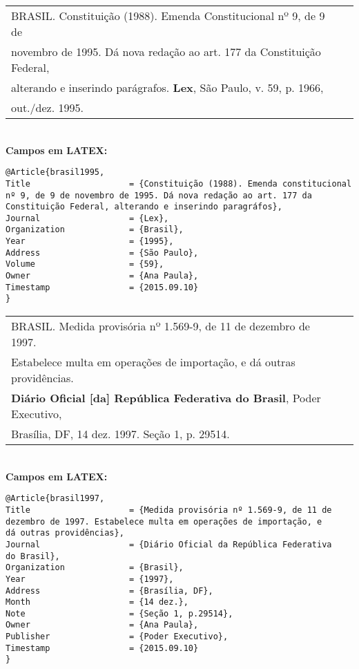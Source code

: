 \begin{tabular}{|l|c|} \hline
BRASIL. Constituição (1988). Emenda Constitucional 
nº 9, de 9 de \\novembro de 1995. Dá nova redação ao art. 177 da Constituição
Federal,\\ alterando e inserindo parágrafos. \textbf{Lex}, São Paulo, v. 59, p. 1966, \\out./dez. 1995.  
	\\\hline
\end{tabular} \\

\textbf{Campos em LATEX:} 

\begin{verbatim}
@Article{brasil1995,
Title                    = {Constituição (1988). Emenda constitucional 
nº 9, de 9 de novembro de 1995. Dá nova redação ao art. 177 da 
Constituição Federal, alterando e inserindo paragráfos},
Journal                  = {Lex},
Organization             = {Brasil},
Year                     = {1995},
Address                  = {São Paulo},
Volume                   = {59},
Owner                    = {Ana Paula},
Timestamp                = {2015.09.10}
}
\end{verbatim}

\begin{tabular}{|l|c|} \hline
BRASIL. Medida provisória nº 1.569-9, de 11 de dezembro de 1997.\\
Estabelece multa em operações de importação, e dá outras
providências.\\ \textbf{Diário Oficial [da] República Federativa do Brasil},
Poder Executivo, \\Brasília, DF, 14 dez. 1997. Seção 1, p. 29514.  
	\\\hline
\end{tabular} \\

\textbf{Campos em LATEX:} 

\begin{verbatim}
@Article{brasil1997,
Title                    = {Medida provisória nº 1.569-9, de 11 de 
dezembro de 1997. Estabelece multa em operações de importação, e 
dá outras providências},
Journal                  = {Diário Oficial da República Federativa 
do Brasil},
Organization             = {Brasil},
Year                     = {1997},
Address                  = {Brasília, DF},
Month                    = {14 dez.},
Note                     = {Seção 1, p.29514},
Owner                    = {Ana Paula},
Publisher                = {Poder Executivo},
Timestamp                = {2015.09.10}
}

\end{verbatim}
